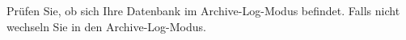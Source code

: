       \item Pr\"ufen Sie, ob sich Ihre Datenbank im Archive-Log-Modus befindet. Falls nicht wechseln Sie in den Archive-Log-Modus.
